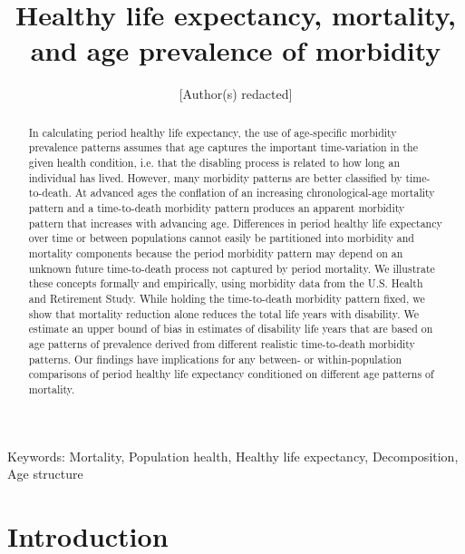 \documentclass[12pt,oneside,letterpaper,doublespacing]{article}  %
\begin{document}
\title{Healthy life expectancy, mortality, and age prevalence of morbidity}

\author{[Author(s) redacted]}


\maketitle

\pagebreak %


\begin{abstract}
In calculating period healthy life expectancy, the use of age-specific
morbidity prevalence patterns assumes that age captures the important
time-variation in the given health condition, i.e. that the disabling process is related to how long an individual has lived. However, many morbidity patterns are better classified by time-to-death. At advanced ages the conflation of an increasing chronological-age mortality pattern and a time-to-death morbidity pattern produces an apparent morbidity pattern that increases with advancing age. Differences in period healthy life expectancy over time or between populations cannot easily be partitioned into morbidity and mortality components because the period morbidity pattern may depend on an unknown future time-to-death process not captured by period mortality. We illustrate these concepts formally and empirically, using morbidity data from the U.S. Health and Retirement Study.
While holding the time-to-death morbidity pattern fixed, we show that mortality
reduction alone reduces the total life years with disability. We estimate an
upper bound of bias in estimates of disability life years that are based on age
patterns of prevalence derived from different realistic time-to-death morbidity
patterns.
Our findings have implications for any between- or within-population
comparisons of period healthy life expectancy conditioned on different age patterns of mortality.
\end{abstract}
Keywords: Mortality, Population health, Healthy life expectancy, Decomposition,
Age structure \pagebreak %

\section{Introduction}
\end{document}
